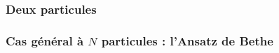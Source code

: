 \subsubsection{Deux particules}%


\subsubsection{Cas général à \(N\) particules : l'Ansatz de Bethe}


